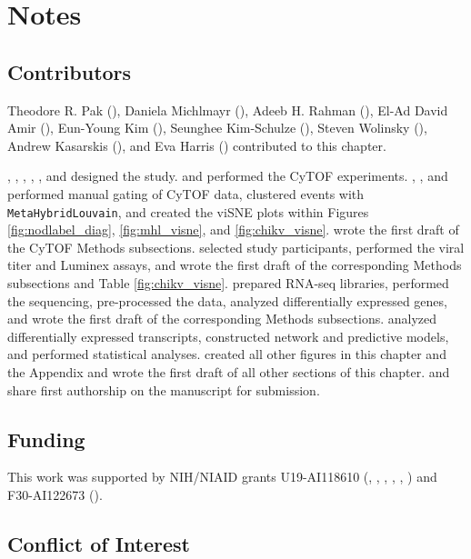 \section*{Notes}

\subsection*{Contributors}

Theodore R. Pak (), Daniela Michlmayr (), Adeeb H. Rahman (), El-Ad David Amir (), Eun-Young Kim (), Seunghee Kim-Schulze (), Steven Wolinsky (), Andrew Kasarskis (), and Eva Harris () contributed to this chapter. 

, , , , , and  designed the study.  and  performed the CyTOF experiments. , , and  performed manual gating of CyTOF data, clustered events with \texttt{MetaHybridLouvain}, and created the viSNE plots within Figures \ref{fig:nodlabel_diag}, \ref{fig:mhl_visne}, and \ref{fig:chikv_visne}.  wrote the first draft of the CyTOF Methods subsections.  selected study participants, performed the viral titer and Luminex assays,  and wrote the first draft of the corresponding Methods subsections and Table \ref{fig:chikv_visne}.  prepared RNA-seq libraries, performed the sequencing, pre-processed the data, analyzed differentially expressed genes, and wrote the first draft of the corresponding Methods subsections.  analyzed differentially expressed transcripts, constructed network and predictive models, and performed statistical analyses.  created all other figures in this chapter and the Appendix and wrote the first draft of all other sections of this chapter.  and  share first authorship on the manuscript for submission.

\subsection*{Funding}

This work was supported by NIH/NIAID grants U19-AI118610 (, , , , , ) and F30-AI122673 ().
\subsection*{Conflict of Interest}

